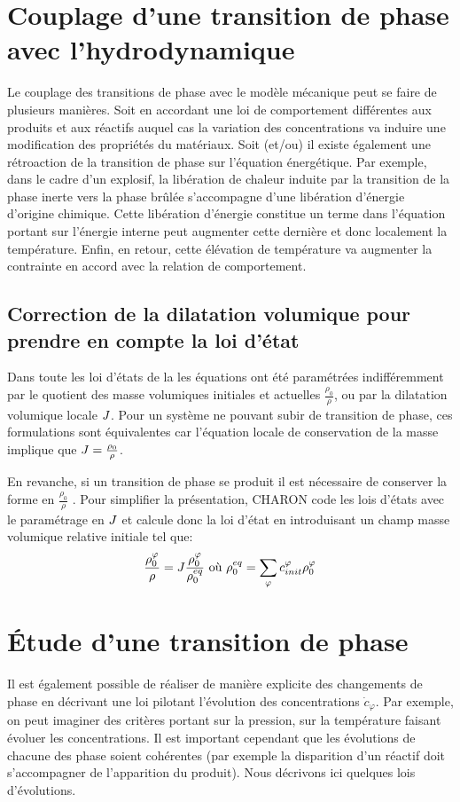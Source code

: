 \documentclass[10pt]{book}
\begin{document}
\section{Couplage d'une transition de phase avec l'hydrodynamique}
Le couplage des transitions de phase avec le modèle mécanique peut se faire de plusieurs manières. Soit en accordant une loi de comportement différentes aux produits et aux réactifs auquel cas la variation des concentrations va induire une modification des propriétés du matériaux. Soit (et/ou) il existe également une rétroaction de la transition de phase sur l'équation énergétique. Par exemple, dans le cadre d'un explosif, la libération de chaleur induite par la transition de la phase inerte vers la phase brûlée s'accompagne d'une libération d'énergie d'origine chimique. Cette libération d'énergie constitue un terme dans l'équation portant sur l'énergie interne peut augmenter cette dernière et donc localement la température. Enfin, en retour, cette élévation de température va augmenter la contrainte en accord avec la relation de comportement.
\subsection{Correction de la dilatation volumique pour prendre en compte la loi d'état}
Dans toute les loi d'états de la  les équations ont été paramétrées indifféremment par le quotient des masse volumiques initiales et actuelles $\frac{\rho_{0}}{\rho}$, ou par la dilatation volumique locale $J$. Pour un système ne pouvant subir de transition de phase, ces formulations sont équivalentes car l'équation locale de conservation de la masse implique que $J = \frac{\rho_{0}}{\rho}$. 

En revanche, si un transition de phase se produit il est nécessaire de conserver la forme en \og $\frac{\rho_{0}}{\rho}$ \fg{}. Pour simplifier la présentation, CHARON code les lois d'états avec le paramétrage en $J$ et calcule donc la loi d'état en introduisant un champ \og masse volumique relative initiale \fg{} tel que: 
$$\dfrac{\rho_{0}^{\varphi}}{\rho} = J\dfrac{\rho_{0}^{\varphi}}{\rho_{0}^{eq}} \text{ où } \rho_{0}^{eq}=\sum_{\varphi}c^{\varphi}_{init}\rho_{0}^{\varphi}$$
\section{Étude d'une transition de phase}
Il est également possible de réaliser de manière explicite des changements de phase en décrivant une loi pilotant l'évolution des concentrations $\dot{c}_{\varphi}$. Par exemple, on peut imaginer des critères portant sur la pression, sur la température faisant évoluer les concentrations. Il est important cependant que les évolutions de chacune des phase soient cohérentes (par exemple la disparition d'un réactif doit s'accompagner de l'apparition du produit). Nous décrivons ici quelques lois d'évolutions.
\end{document}
